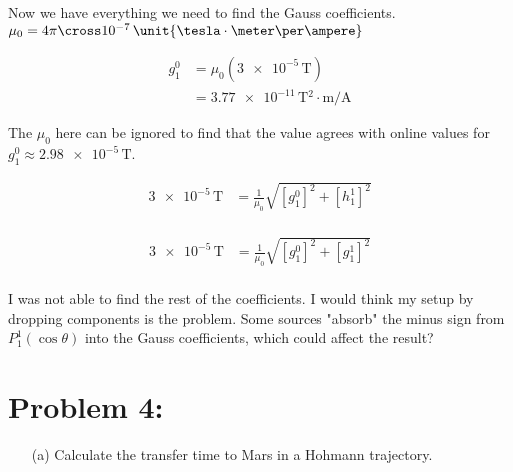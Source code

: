 \documentclass{article}
\begin{document}
{\begin{enumerate}
		Now we have everything we need to find the Gauss coefficients. $\mu_0 = 4\pi \cross 10^{-7} \, \unit{\tesla \cdot \meter\per\ampere}$
		
		\begin{equation*}
			\begin{split}
				g^0_1 &= \mu_0 ( \num{3e-5} \, \unit{\tesla} ) \\
				&= \num{3.77e-11} \, \unit{\tesla^2 \cdot \meter \per \ampere}
			\end{split}
		\end{equation*}
		
		The $\mu_0$ here can be ignored to find that the value agrees with online values for $g^0_1 \approx \num{2.98e-5} \, \unit{\tesla}$.
		
		\begin{equation*}
			\begin{split}
				\num{3e-5} \, \unit{\tesla} &= \frac{1}{\mu_0} \sqrt{\left[ g^0_1 \right]^2	+ \left[ h^1_1 \right]^2} \\
			\end{split}
		\end{equation*}
		
		\begin{equation*}
			\begin{split}
				\num{3e-5} \, \unit{\tesla} &= \frac{1}{\mu_0} \sqrt{\left[ g^0_1 \right]^2	+ \left[ g^1_1 \right]^2} \\
			\end{split}
		\end{equation*}
		
		I was not able to find the rest of the coefficients. I would think my setup by dropping components is the problem. Some sources "absorb" the minus sign from $P^1_1(\cos \theta)$ into the Gauss coefficients, which could affect the result?
		
		
	\end{enumerate}
	
	\section*{Problem 4: }
	\boldmath
	\begin{enumerate}
		\item[(a)] Calculate the transfer time to Mars in a Hohmann trajectory.

\end{enumerate}}
\end{document}

